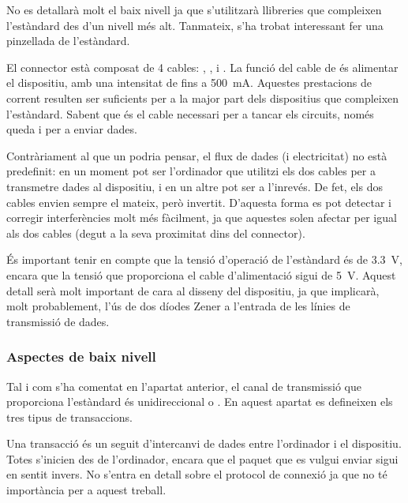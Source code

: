 No es detallarà molt el baix nivell ja que s'utilitzarà llibreries que
compleixen l'estàndard des d'un nivell més alt. Tanmateix, s'ha trobat
interessant fer una pinzellada de l'estàndard.

El connector  està composat de 4 cables: , ,
 i . La funció del cable de  és alimentar el
dispositiu, amb una intensitat de fins a \SI{500}{\milli\ampere}. Aquestes
prestacions de corrent resulten ser suficients per a la major part dels
dispositius que compleixen l'estàndard. Sabent que  és el cable
necessari per a tancar els circuits, només queda  i  per
a enviar dades.

Contràriament al que un podria pensar, el flux de dades (i electricitat) no
està predefinit: en un moment pot ser l'ordinador que utilitzi els dos cables
per a transmetre dades al dispositiu, i en un altre pot ser a l'inrevés. De fet,
els dos cables envien sempre el mateix, però invertit. D'aquesta forma es pot
detectar i corregir interferències molt més fàcilment, ja que aquestes solen
afectar per igual als dos cables (degut a la seva proximitat dins del
connector).

És important tenir en compte que la tensió d'operació de l'estàndard 
és de \SI{3.3}{\volt}, encara que la tensió que proporciona el cable
d'alimentació sigui de \SI{5}{\volt}. Aquest detall serà molt important de cara
al disseny del dispositiu, ja que implicarà, molt probablement, l'ús de dos
díodes Zener a l'entrada de les línies de transmissió de dades.

\subsubsection*{Aspectes de baix nivell}

Tal i com s'ha comentat en l'apartat anterior, el canal de transmissió que
proporciona l'estàndard és unidireccional o . En aquest
apartat es defineixen els tres tipus de transaccions.

Una transacció és un seguit d'intercanvi de dades entre l'ordinador i el
dispositiu. Totes s'inicien des de l'ordinador, encara que el paquet que es
vulgui enviar sigui en sentit invers. No s'entra en detall sobre el protocol
de connexió ja que no té importància per a aquest treball.

